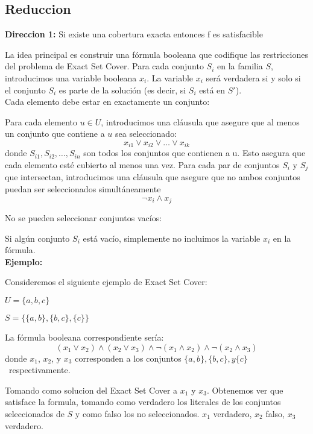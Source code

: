 \documentclass{article}
\begin{document}
\subsection{Reduccion}

\textbf{Direccion 1:} Si existe una cobertura exacta  entonces f es satisfacible

La idea principal es construir una fórmula booleana que codifique las restricciones del problema de Exact Set Cover. Para cada conjunto \(S_i\) en la familia \(S\), introducimos una variable booleana \(x_i\). La variable \(x_i\) será verdadera si y solo si el conjunto \(S_i\) es parte de la solución (es decir, si \(S_i\) está en \(S'\)).\\

Cada elemento debe estar en exactamente un conjunto:

Para cada elemento \(u \in U\), introducimos una cláusula que asegure que al menos un conjunto que contiene a \(u\) sea seleccionado:
\[ x_{i1} \vee x_{i2} \vee \dots \vee x_{ik}\]
donde \(S_{i1}, S_{i2}, \dots, S_{in}\) son todos los conjuntos que contienen a u. Esto asegura que cada elemento esté cubierto al menos una vez.
Para cada par de conjuntos $S_i$ y $S_j$ que intersectan, introducimos una cláusula que asegure que no ambos conjuntos puedan ser seleccionados simultáneamente
\[\neg x_i \wedge x_j\]

No se pueden seleccionar conjuntos vacíos:

Si algún conjunto $S_i$ está vacío, simplemente no incluimos la variable $x_i$ en la fórmula. \\

\textbf{Ejemplo:}

Consideremos el siguiente ejemplo de Exact Set Cover:

\(U = \{a, b, c\}\)

\(S = \{\{a, b\}, \{b, c\}, \{c\}\}\)

La fórmula booleana correspondiente sería:
\[ (x_{1} \vee x_{2}) \wedge (x_{2} \vee x_{3}) \wedge \neg(x_{1} \wedge x_{2}) \wedge \neg(x_{2} \wedge x_{3})\]
donde $x_1$, $x_2$, y $x_3$ corresponden a los conjuntos \(\{a, b\}, \{b, c\}, y \{c\}\)\ respectivamente.

Tomando como solucion del Exact Set Cover a $x_1$ y $x_3$.
Obtenemos ver que satisface la formula, tomando como verdadero los literales de los conjuntos seleccionados de $S$ y como falso los no seleccionados.
$x_1$ verdadero, $x_2$ falso, $x_3$ verdadero. \\
\end{document}
